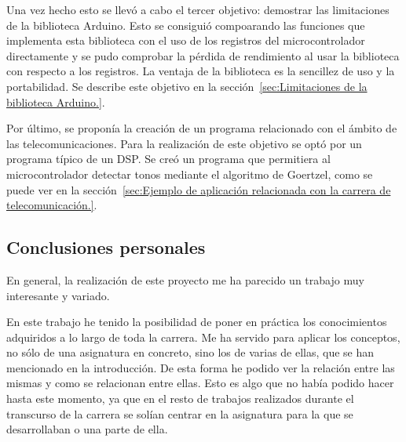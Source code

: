 Una vez hecho esto se llevó a cabo el tercer objetivo: demostrar las limitaciones de la biblioteca Arduino. Esto se consiguió compoarando las funciones que implementa esta biblioteca con el uso de los registros del microcontrolador directamente y se pudo comprobar la pérdida de rendimiento al usar la biblioteca con respecto a los registros. La ventaja de la biblioteca es la sencillez de uso y la portabilidad. Se describe este objetivo en la sección~\ref{sec:Limitaciones de la biblioteca Arduino.}.

Por último, se proponía la creación de un programa relacionado con el ámbito de las telecomunicaciones. Para la realización de este objetivo se optó por un programa típico de un DSP. Se creó un programa que permitiera al microcontrolador detectar tonos mediante el algoritmo de Goertzel, como se puede ver en la sección~\ref{sec:Ejemplo de aplicación relacionada con la carrera de telecomunicación.}.

\subsection{Conclusiones personales}

En general, la realización de este proyecto me ha parecido un trabajo muy interesante y variado.



En este trabajo he tenido la posibilidad de poner en práctica los conocimientos adquiridos a lo largo de toda la carrera. Me ha servido para aplicar los conceptos, no sólo de una asignatura en concreto, sino los de varias de ellas, que se han mencionado en la introducción. De esta forma he podido ver la relación entre las mismas y como se relacionan entre ellas. Esto es algo que no había podido hacer hasta este momento, ya que en el resto 
de trabajos realizados durante el transcurso de la carrera se solían centrar en la asignatura para la que se desarrollaban o una parte de ella.


